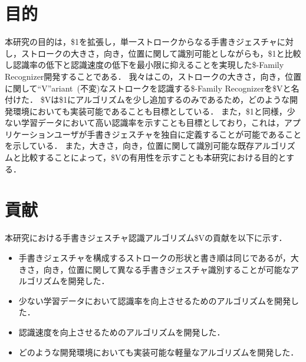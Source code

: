 \section{目的}
本研究の目的は，\$1を拡張し，単一ストロークからなる手書きジェスチャに対し，ストロークの大きさ，向き，位置に関して識別可能としながらも，\$1と比較し認識率の低下と認識速度の低下を最小限に抑えることを実現した\$-Family Recognizer開発することである．
我々はこの，ストロークの大きさ，向き，位置に関して``V''ariant~(不変)なストロークを認識する\$-Family Recognizerを\$Vと名付けた．
\$Vは\$1にアルゴリズムを少し追加するのみであるため，どのような開発環境においても実装可能であることも目標としている．
また，\$1と同様，少ない学習データにおいて高い認識率を示すことも目標としており，これは，アプリケーションユーザが手書きジェスチャを独自に定義することが可能であることを示している．
また，大きさ，向き，位置に関して識別可能な既存アルゴリズムと比較することによって，\$Vの有用性を示すことも本研究における目的とする．



\section{貢献}
本研究における手書きジェスチャ認識アルゴリズム\$Vの貢献を以下に示す．
\begin{itemize}
\item 手書きジェスチャを構成するストロークの形状と書き順は同じであるが，大きさ，向き，位置に関して異なる手書きジェスチャ識別することが可能なアルゴリズムを開発した．
\item 少ない学習データにおいて認識率を向上させるためのアルゴリズムを開発した．
\item 認識速度を向上させるためのアルゴリズムを開発した．
\item どのような開発環境においても実装可能な軽量なアルゴリズムを開発した．
\end{itemize}

